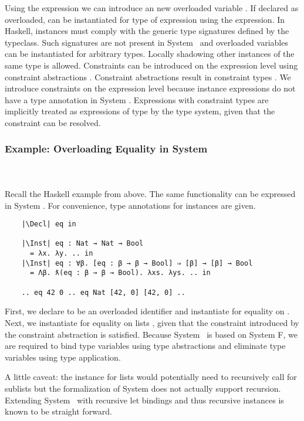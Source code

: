 \noindent Using the  expression we can introduce an new overloaded variable . 
If declared as overloaded,  can be instantiated for type  of expression  using the  expression.
In Haskell, instances must comply with the generic type signatures defined by the typeclass. Such signatures are not present in System \Fo\ and overloaded variables can be instantiated for arbitrary types.
Locally shadowing other instances of the same type is allowed.
Constraints can be introduced on the expression level using constraint abstractions . 
Constraint abstractions result in constraint types . 
We introduce constraints on the expression level because instance expressions do not have a type annotation in System \Fo.
Expressions with constraint types  are implicitly treated as expressions of type  by the type system, given that the constraint  can be resolved.

\subsubsection{Example: Overloading Equality in System \Fo}\hfill\\\\
Recall the Haskell example from above. 
The same functionality can be expressed in System \Fo. 
For convenience, type annotations for instances are given.
\begin{verbatim}
    |\Decl| eq in

    |\Inst| eq : Nat → Nat → Bool 
      = λx. λy. .. in
    |\Inst| eq : ∀β. [eq : β → β → Bool] ⇒ [β] → [β] → Bool 
      = Λβ. ƛ(eq : β → β → Bool). λxs. λys. .. in

    .. eq 42 0 .. eq Nat [42, 0] [42, 0] .. 
\end{verbatim} 
First, we declare  to be an overloaded identifier and instantiate  for equality on . 
Next, we instantiate  for equality on lists \inl{[β]}, given that the constraint  introduced by the constraint abstraction  is satisfied. 
Because System \Fo\ is based on System F, we are required to bind type variables using type abstractions  and eliminate type variables using type application. 

\noindent A little caveat: the instance for lists would potentially need to recursively call  for sublists but the formalization of System \Fo does not actually support recursion. Extending System \Fo\ with recursive let bindings and thus recursive instances is known to be straight forward. 

